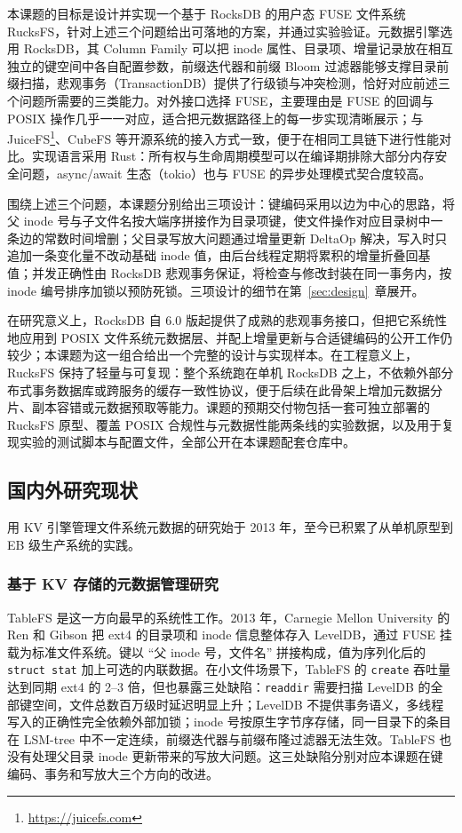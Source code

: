本课题的目标是设计并实现一个基于 RocksDB 的用户态 FUSE 文件系统 RucksFS，针对上述三个问题给出可落地的方案，并通过实验验证。元数据引擎选用 RocksDB，其 Column Family 可以把 inode 属性、目录项、增量记录放在相互独立的键空间中各自配置参数，前缀迭代器和前缀 Bloom 过滤器能够支撑目录前缀扫描，悲观事务（TransactionDB）提供了行级锁与冲突检测，恰好对应前述三个问题所需要的三类能力。对外接口选择 FUSE，主要理由是 FUSE 的回调与 POSIX 操作几乎一一对应，适合把元数据路径上的每一步实现清晰展示；与 JuiceFS\footnote{\url{https://juicefs.com}}、CubeFS\cite{liu2019cubefs} 等开源系统的接入方式一致，便于在相同工具链下进行性能对比。实现语言采用 Rust\cite{klabnik2023rust}：所有权与生命周期模型可以在编译期排除大部分内存安全问题，async/await 生态（tokio）也与 FUSE 的异步处理模式契合度较高。

围绕上述三个问题，本课题分别给出三项设计：键编码采用以边为中心的思路，将父 inode 号与子文件名按大端序拼接作为目录项键，使文件操作对应目录树中一条边的常数时间增删；父目录写放大问题通过增量更新 DeltaOp 解决，写入时只追加一条变化量不改动基础 inode 值，由后台线程定期将累积的增量折叠回基值；并发正确性由 RocksDB 悲观事务保证，将检查与修改封装在同一事务内，按 inode 编号排序加锁以预防死锁。三项设计的细节在第~\ref{sec:design}~章展开。

在研究意义上，RocksDB 自 6.0 版起提供了成熟的悲观事务接口，但把它系统性地应用到 POSIX 文件系统元数据层、并配上增量更新与合适键编码的公开工作仍较少；本课题为这一组合给出一个完整的设计与实现样本。在工程意义上，RucksFS 保持了轻量与可复现：整个系统跑在单机 RocksDB 之上，不依赖外部分布式事务数据库或跨服务的缓存一致性协议，便于后续在此骨架上增加元数据分片、副本容错或元数据预取等能力。课题的预期交付物包括一套可独立部署的 RucksFS 原型、覆盖 POSIX 合规性与元数据性能两条线的实验数据，以及用于复现实验的测试脚本与配置文件，全部公开在本课题配套仓库中。

\subsection{国内外研究现状}

用 KV 引擎管理文件系统元数据的研究始于 2013 年，至今已积累了从单机原型到 EB 级生产系统的实践。

\subsubsection{基于 KV 存储的元数据管理研究}

TableFS\cite{ren2013tablefs} 是这一方向最早的系统性工作。2013 年，Carnegie Mellon University 的 Ren 和 Gibson 把 ext4 的目录项和 inode 信息整体存入 LevelDB，通过 FUSE 挂载为标准文件系统。键以 “父 inode 号，文件名” 拼接构成，值为序列化后的 \texttt{struct stat} 加上可选的内联数据。在小文件场景下，TableFS 的 \texttt{create} 吞吐量达到同期 ext4 的 2--3 倍，但也暴露三处缺陷：\texttt{readdir} 需要扫描 LevelDB 的全部键空间，文件总数百万级时延迟明显上升；LevelDB 不提供事务语义，多线程写入的正确性完全依赖外部加锁；inode 号按原生字节序存储，同一目录下的条目在 LSM-tree 中不一定连续，前缀迭代器与前缀布隆过滤器无法生效。TableFS 也没有处理父目录 inode 更新带来的写放大问题。这三处缺陷分别对应本课题在键编码、事务和写放大三个方向的改进。

